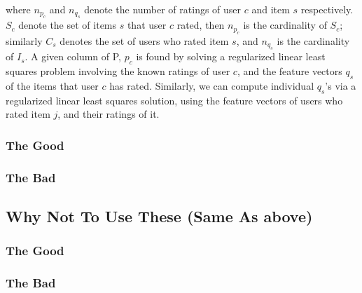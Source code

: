 where $n_{p_{c}}$ and $n_{q_{s}}$ denote the number of ratings of user $c$ and item $s$ respectively. $S_{c}$ denote the set of items $s$ that user $c$ rated, then $n_{p_{c}}$ is the cardinality of $S_{c}$; similarly $C_{s}$ denotes the set of users who rated item $s$, and $n_{q_{s}}$ is the cardinality of $I_{s}$. A given column of P, $p_{c}$ is found by solving a regularized linear least squares problem involving the known ratings of user $c$, and the feature vectors $q_{s}$ of the items that user $c$ has rated. Similarly, we can compute individual $q_{s}$'s via a regularized linear least squares solution, using the feature vectors of users who rated item $j$, and their ratings of it.



\subsubsection{The Good}
\subsubsection{The Bad}
\subsection{Why Not To Use These (Same As above)}
\subsubsection{The Good}
\subsubsection{The Bad}
